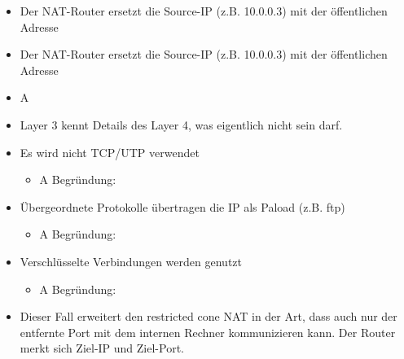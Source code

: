 \begin{itemize}
    \item Der NAT-Router ersetzt die Source-IP (z.B. 10.0.0.3) mit der öffentlichen Adresse
\end{itemize}

\begin{itemize}
    \item Der NAT-Router ersetzt die Source-IP (z.B. 10.0.0.3) mit der öffentlichen Adresse
\end{itemize}

\begin{itemize}
    \item \todo A
\end{itemize}

\begin{itemize}
    \item Layer 3 kennt Details des Layer 4, was eigentlich nicht sein darf.
\end{itemize}

\begin{itemize}
    \item Es wird nicht TCP/UTP verwendet
    \begin{itemize}
        \item \todo A Begründung:
    \end{itemize}
    \item Übergeordnete Protokolle übertragen die IP als Paload (z.B. ftp)
    \begin{itemize}
        \item \todo A Begründung:
    \end{itemize}
    \item Verschlüsselte Verbindungen werden genutzt
    \begin{itemize}
        \item \todo A Begründung:
    \end{itemize}
\end{itemize}

\begin{itemize}
    \item Dieser Fall erweitert den restricted cone NAT in der Art, dass auch nur der entfernte Port mit dem internen Rechner kommunizieren kann. Der Router merkt sich Ziel-IP und Ziel-Port.
\end{itemize}